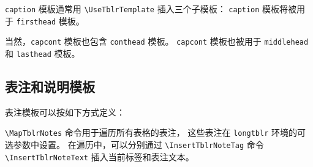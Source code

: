\documentclass[oneside]{book}
\begin{document}
\verb!caption! 模板通常用 \verb!\UseTblrTemplate! 插入三个子模板：
\verb!caption! 模板将被用于 \verb!firsthead! 模板。

\begin{codehigh}
\end{codehigh}

当然，\verb!capcont! 模板也包含 \verb!conthead! 模板。
\verb!capcont! 模板也被用于 \verb!middlehead! 和 \verb!lasthead! 模板。

\begin{codehigh}
\end{codehigh}

\subsection{表注和说明模板}

表注模板可以按如下方式定义：

\begin{codehigh}
\end{codehigh}
\begin{codehigh}
\end{codehigh}

\verb!\MapTblrNotes! 命令用于遍历所有表格的表注，
这些表注在 \verb!longtblr! 环境的可选参数中设置。
在遍历中，可以分别通过 \verb!\InsertTblrNoteTag! 命令 \verb!\InsertTblrNoteText!
插入当前标签和表注文本。
\end{document}
